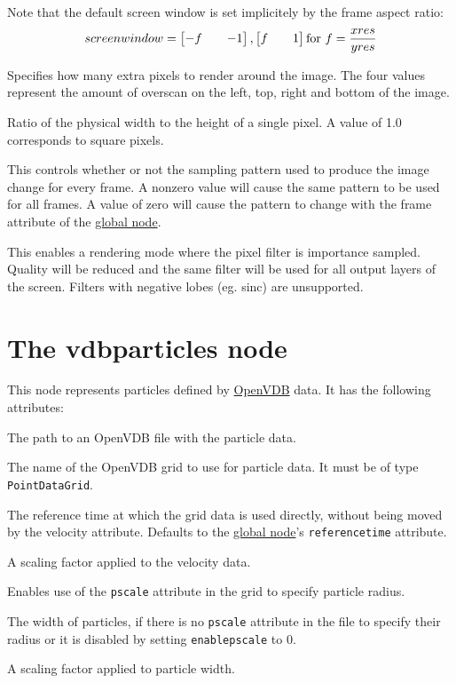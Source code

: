 \documentclass[oneside,ebook]{memoir}
\newcommand{\paramlistitemTN}[2]{\item[#2\textcolor{lightgray}{\dotfill}#1]}
\newcommand{\paramlistitemTND}[3]{\paramlistitemTN{#1 {\rmfamily({\ttfamily#3})}}{#2}}
\begin{document}
\begin{paramlist}
Note that the default screen window is set implicitely by the frame aspect ratio:
\[
screenwindow = \begin{bmatrix}-f && -1\end{bmatrix}, \begin{bmatrix}f && 1\end{bmatrix} \text{for } f=\dfrac{xres}{yres}\\
\]
\paramlistitemTN{2 $\times$ int\lbrack{}2\rbrack{}}{overscan}
Specifies how many extra pixels to render around the image. The four values represent the amount of overscan on the left, top, right and bottom of the image.
\paramlistitemTN{float}{pixelaspectratio}
Ratio of the physical width to the height of a single pixel. A value of 1.0 corresponds to square pixels.
\paramlistitemTND{int}{staticsamplingpattern}{0}
This controls whether or not the sampling pattern used to produce the image change for every frame. A nonzero value will cause the same pattern to be used for all frames. A value of zero will cause the pattern to change with the frame attribute of the  \hyperref[section:globalnode]{global node}.
\paramlistitemTND{int}{importancesamplefilter}{0}
This enables a rendering mode where the pixel filter is importance sampled. Quality will be reduced and the same filter will be used for all output layers of the screen. Filters with negative lobes (eg. sinc) are unsupported.
\end{paramlist}

\section{The vdbparticles node}
\label{section:vdbparticlesnode}
This node represents particles defined by \href{http:/www.openvdb.org}{OpenVDB} data.
It has the following attributes:

\begin{paramlist}
\paramlistitemTN{string}{vdbfilename}
The path to an OpenVDB file with the particle data.
\paramlistitemTN{string}{pointsgrid}
The name of the OpenVDB grid to use for particle data.
It must be of type \lstinline|PointDataGrid|.
\paramlistitemTN{double}{velocityreferencetime}
The reference time at which the grid data is used directly, without being moved by the velocity attribute.
Defaults to the \hyperref[section:globalnode]{global node}'s \lstinline|referencetime| attribute.
\paramlistitemTND{double}{velocityscale}{1}
A scaling factor applied to the velocity data.
\paramlistitemTND{int}{enablepscale}{1}
Enables use of the \lstinline|pscale| attribute in the grid to specify particle radius.
\paramlistitemTND{double}{width}{1}
The width of particles, if there is no \lstinline|pscale| attribute in the file to specify their radius or it is disabled by setting \lstinline|enablepscale| to 0.
\paramlistitemTND{double}{widthscale}{1}
A scaling factor applied to particle width.
\end{paramlist}
\end{document}
